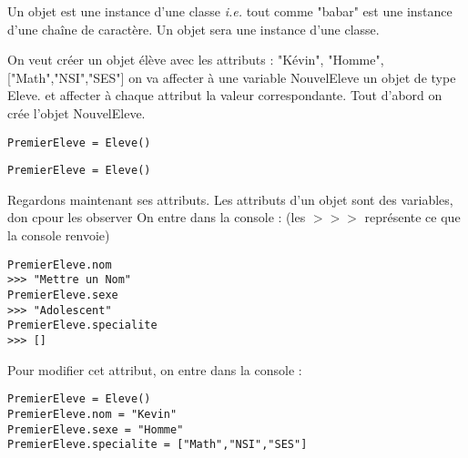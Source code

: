 \documentclass[12pt,fleqn]{report} %
\begin{document}
\begin{definition}
	Un objet est une instance d'une classe \emph{i.e.} tout comme "babar" est une instance d'une chaîne de caractère. Un objet sera une instance d'une classe.
\end{definition}

 On veut créer un objet élève avec les attributs : "Kévin", "Homme", ["Math","NSI","SES"] on va affecter à une variable NouvelEleve un objet de type Eleve. et affecter à chaque attribut la valeur correspondante. Tout d'abord on crée l'objet NouvelEleve. 

\begin{center}
	\begin{varwidth}[t]{.5\textwidth}
		\begin{lstlisting}[language=Pseudo,linewidth = 6cm]
PremierEleve = Eleve()\end{lstlisting}
\end{varwidth}\hspace{2cm} \begin{varwidth}[t]{.5\textwidth}
\begin{lstlisting}[language=iPython,linewidth = 6cm]
PremierEleve = Eleve()\end{lstlisting}
\end{varwidth}\end{center}

Regardons maintenant ses attributs. Les attributs d'un objet sont des variables, don cpour les observer On entre dans la console : (les $>>>$ représente ce que la console renvoie)
\begin{center}
	\begin{varwidth}[t]{.5\textwidth}
		\begin{lstlisting}[language=iPython,linewidth = 12cm]
PremierEleve.nom 
>>> "Mettre un Nom"  
PremierEleve.sexe
>>> "Adolescent"
PremierEleve.specialite
>>> []\end{lstlisting}
\end{varwidth}\end{center}

Pour modifier cet attribut, on entre dans la console : 
\begin{center}
	\begin{varwidth}[t]{.5\textwidth}
		\begin{lstlisting}[language=Pseudo,linewidth = 12cm]
PremierEleve = Eleve()
PremierEleve.nom = "Kevin"
PremierEleve.sexe = "Homme"
PremierEleve.specialite = ["Math","NSI","SES"]
		\end{lstlisting}
\end{varwidth}\end{center}
\end{document}
